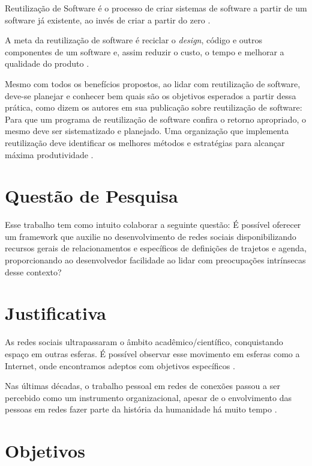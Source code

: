 Reutilização de Software é o processo de criar sistemas de software a partir de um software já existente, ao invés de criar a partir do zero \cite{Krueger:1992}.

A meta da reutilização de software é reciclar o \textit{design}, código e outros componentes de um software e, assim reduzir o custo, o tempo e melhorar a qualidade do produto \cite{Keswani:Joshi:Jatain:2014}.

Mesmo com todos os benefícios propostos, ao lidar com reutilização de software, deve-se planejar e conhecer bem quais são os objetivos esperados a partir dessa prática, como dizem os autores em sua publicação sobre reutilização de software: Para que um programa de reutilização de software confira o retorno apropriado, o mesmo deve ser sistematizado e planejado. Uma organização que implementa reutilização deve identificar os melhores métodos e estratégias para alcançar máxima produtividade \cite{Keswani:Joshi:Jatain:2014}.

\section{Questão de Pesquisa}

Esse trabalho tem como intuito colaborar a seguinte questão: É possível oferecer um framework que auxilie no desenvolvimento de redes sociais disponibilizando recursos gerais de relacionamentos e específicos de definições de trajetos e agenda, proporcionando ao desenvolvedor facilidade ao lidar com preocupações intrínsecas desse contexto?

\section{Justificativa}

As redes sociais ultrapassaram o âmbito acadêmico/científico, conquistando espaço em outras esferas. É possível observar esse movimento em esferas como a Internet, onde encontramos adeptos com objetivos específicos \cite{Tomae:Alcara:Chiara:2005}.

Nas últimas décadas, o trabalho pessoal em redes de conexões passou a ser percebido como um instrumento organizacional, apesar de o envolvimento das pessoas em redes fazer parte da história da humanidade há muito tempo \cite{Tomae:Alcara:Chiara:2005}.

\section{Objetivos}

